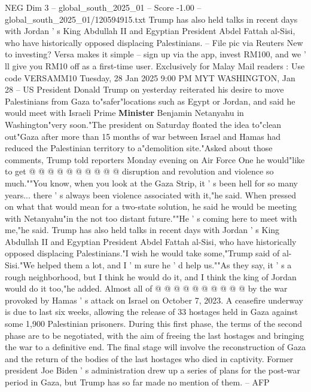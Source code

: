 \begin{textsample}{NEG Dim 3 – global\_south\_2025\_01 – Score -1.00 – global\_south\_2025\_01/120594915.txt}  \label{ex:f3_neg_057}
Trump has also held talks in recent days with Jordan ' s King Abdullah II and Egyptian President Abdel Fattah al-Sisi, who have historically opposed displacing Palestinians. -- File pic via Reuters New to investing?
Versa makes it simple -- sign up via the app, invest RM100, and we ' ll give you RM10 off as a first-time user.
Exclusively for Malay Mail readers : Use code VERSAMM10 Tuesday, 28 Jan 2025 9:00 PM MYT WASHINGTON, Jan 28 -- US President Donald Trump on yesterday reiterated his desire to move Palestinians from Gaza to"safer"locations such as Egypt or Jordan, and said he would meet with Israeli Prime \textbf{Minister} Benjamin Netanyahu in Washington"very soon."The president on Saturday floated the idea to"clean out"Gaza after more than 15 months of war between Israel and Hamas had reduced the Palestinian territory to a"demolition site."Asked about those comments, Trump told reporters Monday evening on Air Force One he would"like to get @ @ @ @ @ @ @ @ @ @ disruption and revolution and violence so much.""You know, when you look at the Gaza Strip, it ' s been hell for so many years... there ' s always been violence associated with it,"he said.
When pressed on what that would mean for a two-state solution, he said he would be meeting with Netanyahu"in the not too distant future.""He ' s coming here to meet with me,"he said.
Trump has also held talks in recent days with Jordan ' s King Abdullah II and Egyptian President Abdel Fattah al-Sisi, who have historically opposed displacing Palestinians."I wish he would take some,"Trump said of al-Sisi."We helped them a lot, and I ' m sure he ' d help us.""As they say, it ' s a rough neighborhood, but I think he would do it, and I think the king of Jordan would do it too,"he added.
Almost all of @ @ @ @ @ @ @ @ @ @ by the war provoked by Hamas ' s attack on Israel on October 7, 2023.
A ceasefire underway is due to last six weeks, allowing the release of 33 hostages held in Gaza against some 1,900 Palestinian prisoners.
During this first phase, the terms of the second phase are to be negotiated, with the aim of freeing the last hostages and bringing the war to a definitive end.
The final stage will involve the reconstruction of Gaza and the return of the bodies of the last hostages who died in captivity.
Former president Joe Biden ' s administration drew up a series of plans for the post-war period in Gaza, but Trump has so far made no mention of them. -- AFP

\end{textsample}
